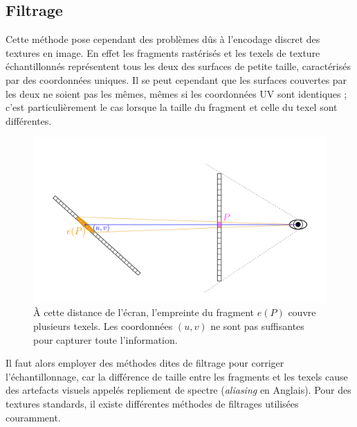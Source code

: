 \subsection*{Filtrage}

Cette méthode pose cependant des problèmes dûs à l'encodage discret des textures en image. En effet les fragments rastérisés et les texels de texture échantillonnés représentent tous les deux des surfaces de petite taille, caractérisés par des coordonnées uniques. Il se peut cependant que les surfaces couvertes par les deux ne soient pas les mêmes, mêmes si les coordonnées UV sont identiques ; c'est particulièrement le cas lorsque la taille du fragment et celle du texel sont différentes. 

\begin{figure}
    \centering
    \includegraphics[width=\textwidth]{contenu/resources/images/schema_filtrage}
    \caption[Visualisation du problème d'échantillonnage lors du rendu par rastérisation]{À cette distance de l'écran, l'empreinte du fragment $e(P)$ couvre plusieurs texels. Les coordonnées $(u, v)$ ne sont pas suffisantes pour capturer toute l'information.}
    \label{fig:aliasing}
\end{figure}

Il faut alors employer des méthodes dites de filtrage pour corriger l'échantillonnage, car la différence de taille entre les fragments et les texels cause des artefacts visuels appelés repliement de spectre (\textit{aliasing} en Anglais). Pour des textures standards, il existe différentes méthodes de filtrages utilisées couramment.

